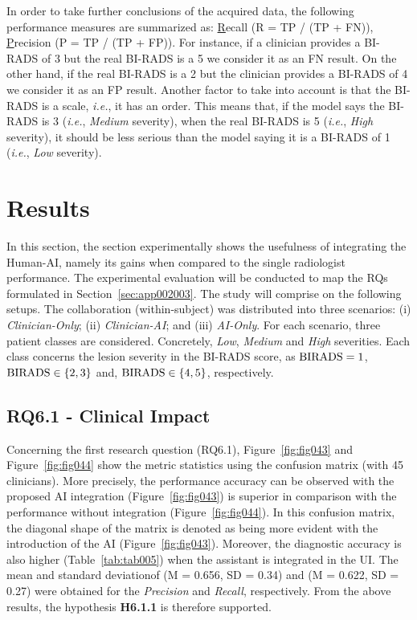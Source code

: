 In order to take further conclusions of the acquired data, the following performance measures are summarized as: \underline{R}ecall (R = \ac{TP} / (\ac{TP} + \ac{FN})), \underline{P}recision (P = \ac{TP} / (\ac{TP} + \ac{FP})).
For instance, if a clinician provides a \ac{BI-RADS} of 3 but the real \ac{BI-RADS} is a 5 we consider it as an \ac{FN} result.
On the other hand, if the real \ac{BI-RADS} is a 2 but the clinician provides a \ac{BI-RADS} of 4 we consider it as an \ac{FP} result.
Another factor to take into account is that the \ac{BI-RADS} is a scale, {\it i.e.}, it has an order.
This means that, if the model says the \ac{BI-RADS} is 3 ({\it i.e.}, {\it Medium} severity), when the real \ac{BI-RADS} is 5 ({\it i.e.}, {\it High} severity), it should be less serious than the model saying it is a \ac{BI-RADS} of 1 ({\it i.e.}, {\it Low} severity).

\section{Results}
\label{sec:app002006}

In this section, the section experimentally shows the usefulness of integrating the Human-\ac{AI}, namely its gains when compared to the single radiologist performance.
The experimental evaluation will be conducted to map the \acp{RQ} formulated in Section~\ref{sec:app002003}.
The study will comprise on the following setups.
The collaboration (within-subject) was distributed into three scenarios: (i) {\it Clinician-Only}; (ii) {\it Clinician-AI}; and (iii) {\it AI-Only}.
For each scenario, three patient classes are considered.
Concretely, {\it Low}, {\it Medium} and {\it High} severities.
Each class concerns the lesion severity in the \ac{BI-RADS} score, as ${\rm BIRADS} = 1$, ${\rm BIRADS} \in\{2, 3\}$ and, ${\rm BIRADS}\in\{4, 5\}$, respectively.

\subsection{RQ6.1 - Clinical Impact}
\label{sec:app002006001}

Concerning the first research question (RQ6.1), Figure~\ref{fig:fig043} and Figure~\ref{fig:fig044} show the metric statistics using the confusion matrix (with 45 clinicians).
More precisely, the performance accuracy can be observed with the proposed \ac{AI} integration (Figure~\ref{fig:fig043}) is superior in comparison with the performance without integration (Figure~\ref{fig:fig044}).
In this confusion matrix, the diagonal shape of the matrix is denoted as being more evident with the introduction of the \ac{AI} (Figure~\ref{fig:fig043}).
Moreover, the diagnostic accuracy is also higher (Table~\ref{tab:tab005}) when the assistant is integrated in the \ac{UI}.
The mean and standard deviation\footnotemark[40] of (M = 0.656, SD = 0.34) and 
(M = 0.622, SD = 0.27) were obtained for the {\it Precision} and {\it Recall}, respectively.
From the above results, the hypothesis {\bf H6.1.1} is therefore supported.

